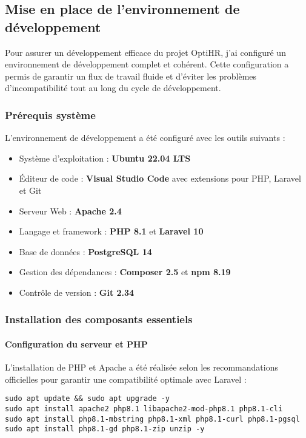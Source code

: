 \subsection{Mise en place de l'environnement de développement}

Pour assurer un développement efficace du projet OptiHR, j'ai configuré un environnement de développement complet et cohérent. Cette configuration a permis de garantir un flux de travail fluide et d'éviter les problèmes d'incompatibilité tout au long du cycle de développement.

\subsubsection{Prérequis système}
L'environnement de développement a été configuré avec les outils suivants :
\begin{itemize}
    \item Système d'exploitation : \textbf{Ubuntu 22.04 LTS}
    \item Éditeur de code : \textbf{Visual Studio Code} avec extensions pour PHP, Laravel et Git
    \item Serveur Web : \textbf{Apache 2.4}
    \item Langage et framework : \textbf{PHP 8.1} et \textbf{Laravel 10}
    \item Base de données : \textbf{PostgreSQL 14}
    \item Gestion des dépendances : \textbf{Composer 2.5} et \textbf{npm 8.19}
    \item Contrôle de version : \textbf{Git 2.34}
\end{itemize}

\subsubsection{Installation des composants essentiels}

\paragraph{Configuration du serveur et PHP}
L'installation de PHP et Apache a été réalisée selon les recommandations officielles pour garantir une compatibilité optimale avec Laravel :

\begin{tcolorbox}[colback=black, coltext=white, title=Installation de PHP et Apache, fonttitle=\bfseries]
\texttt{sudo apt update \&\& sudo apt upgrade -y} \\
\texttt{sudo apt install apache2 php8.1 libapache2-mod-php8.1 php8.1-cli} \\
\texttt{sudo apt install php8.1-mbstring php8.1-xml php8.1-curl php8.1-pgsql} \\
\texttt{sudo apt install php8.1-gd php8.1-zip unzip -y}
\end{tcolorbox}

